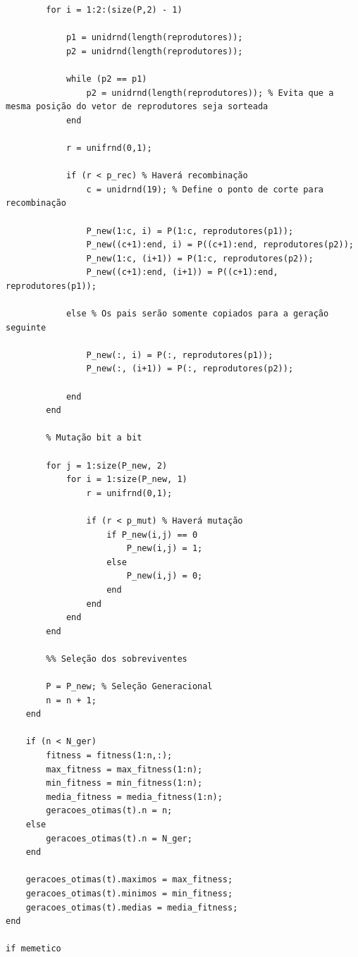 \documentclass{report}
\begin{document}
\begin{lstlisting}
        for i = 1:2:(size(P,2) - 1)
            
            p1 = unidrnd(length(reprodutores));
            p2 = unidrnd(length(reprodutores));

            while (p2 == p1)
                p2 = unidrnd(length(reprodutores)); % Evita que a mesma posição do vetor de reprodutores seja sorteada
            end

            r = unifrnd(0,1);
            
            if (r < p_rec) % Haverá recombinação
                c = unidrnd(19); % Define o ponto de corte para recombinação
                
                P_new(1:c, i) = P(1:c, reprodutores(p1));
                P_new((c+1):end, i) = P((c+1):end, reprodutores(p2));
                P_new(1:c, (i+1)) = P(1:c, reprodutores(p2));
                P_new((c+1):end, (i+1)) = P((c+1):end, reprodutores(p1));

            else % Os pais serão somente copiados para a geração seguinte
                
                P_new(:, i) = P(:, reprodutores(p1));
                P_new(:, (i+1)) = P(:, reprodutores(p2));

            end
        end

        % Mutação bit a bit

        for j = 1:size(P_new, 2)
            for i = 1:size(P_new, 1)
                r = unifrnd(0,1);
                
                if (r < p_mut) % Haverá mutação
                    if P_new(i,j) == 0
                        P_new(i,j) = 1;
                    else
                        P_new(i,j) = 0;
                    end
                end
            end
        end

        %% Seleção dos sobreviventes    

        P = P_new; % Seleção Generacional
        n = n + 1;
    end

    if (n < N_ger)
        fitness = fitness(1:n,:);
        max_fitness = max_fitness(1:n);
        min_fitness = min_fitness(1:n);
        media_fitness = media_fitness(1:n);
        geracoes_otimas(t).n = n;
    else
        geracoes_otimas(t).n = N_ger;
    end
    
    geracoes_otimas(t).maximos = max_fitness;
    geracoes_otimas(t).minimos = min_fitness;
    geracoes_otimas(t).medias = media_fitness;
end

if memetico


\end{lstlisting}
\end{document}
